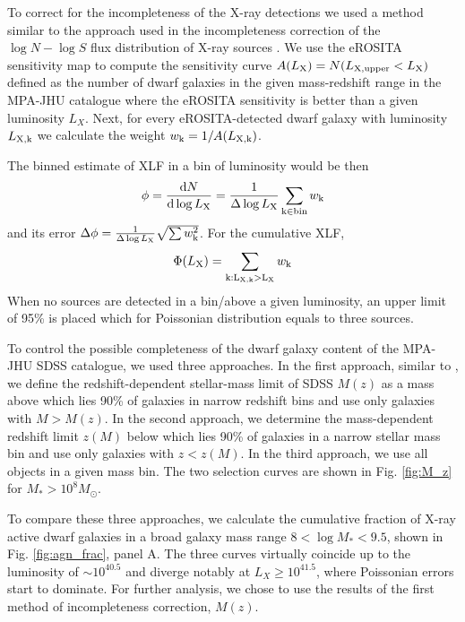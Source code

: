 \documentclass[fleqn,usenatbib]{mnras}
\newcommand{\msun}{M_\odot}
\newcommand{\dd}{\mathrm{d}}
\begin{document}
To correct for the incompleteness of the X-ray detections we used a method similar to the approach used in the incompleteness correction of the $\log N - \log S$ flux distribution of X-ray sources \citep{Shtykovskiy2005, Voss2009}. We use the eROSITA sensitivity map to compute the sensitivity curve $A(L_{\rm X})=N(L_{\rm X, upper}<L_{\rm X})$ defined as the number of dwarf galaxies in the given mass-redshift range in the MPA-JHU catalogue where the eROSITA sensitivity is better than a given luminosity $L_X$. Next, for every eROSITA-detected dwarf galaxy  with luminosity $L_{\rm X, k}$  we calculate the weight $w_{\rm k} = 1/A(L_{\rm X, k})$. 



The binned estimate of XLF in a bin of luminosity would be then $$\phi = \frac{\dd N}{\dd\log{L_{\rm X}}} = \frac{1}{\Delta\log{L_{\rm X}}} \sum_{\rm k\in \text{bin}}{w_{\rm k}}$$ and its error $\Delta\phi= \frac{1}{\Delta\log{L_{\rm X}}}\sqrt{\sum{w_{\rm k}^2}}$. For the cumulative XLF, $$\Phi(L_{\rm X})=\sum_{\rm k: L_{\rm X, k}>L_{\rm X}}{w_{\rm k}}$$
When no sources are detected in a bin/above a given luminosity, an upper limit of 95\% is placed which for Poissonian distribution equals to three sources.

To control the possible completeness  of the dwarf galaxy content of  the MPA-JHU SDSS catalogue, we used three approaches. In the first approach, similar to \citealt{Birchall2022}, we define the redshift-dependent stellar-mass limit of SDSS $M(z)$ as a mass above which lies 90\% of galaxies in narrow redshift bins and use only galaxies with $M>M(z)$. In the second approach, we determine the mass-dependent redshift limit $z(M)$ below which lies 90\% of galaxies in a narrow stellar mass bin and use only galaxies with $z<z(M)$. In the third approach, we use all objects in a given mass bin. The  two selection curves are shown in Fig. \ref{fig:M_z} for $M_*>10^8 \msun$.

To compare these three approaches, we calculate the cumulative fraction of X-ray active  dwarf galaxies in a broad galaxy mass range $8<\log{M_*}<9.5$,  shown in Fig. \ref{fig:agn_frac},  panel A.  The three curves virtually coincide up to the luminosity of $\sim10^{40.5}$ and  diverge notably at $L_X\ge 10^{41.5}$, where Poissonian errors start to dominate. For further analysis, we chose to use the results of the first method of incompleteness correction, $M(z)$.
\end{document}
